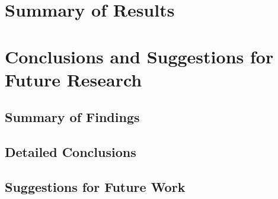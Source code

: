 \documentclass[11pt]{book}
\begin{document}
\section{}

\chapter{Summary of Results}\label{results_summary}


\chapter[Conclusions \& Future Research]{Conclusions and Suggestions for Future Research}
\label{conclude}

\section{Summary of Findings}

\section{Detailed Conclusions}

\section{Suggestions for Future Work}




 \markright{ }
\end{document}
